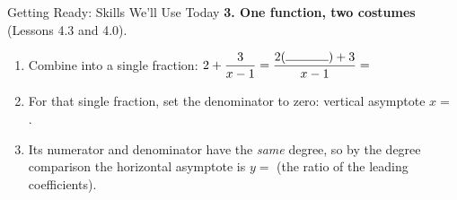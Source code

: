 \documentclass[10pt]{article}
\begin{document}
\begin{notesbox}{Getting Ready: Skills We'll Use Today}
\vspace{4pt}
\textbf{3. One function, two costumes} (Lessons 4.3 and 4.0).
\begin{enumerate}[label=(\alph*), leftmargin=2.1em, itemsep=3pt]
  \item Combine into a single fraction: \; $2+\dfrac{3}{x-1}=\dfrac{2(\rule{1.2cm}{0.4pt})+3}{x-1}
        =$ \blank{2.0cm}
  \item For that single fraction, set the denominator to zero: vertical asymptote
        $x=$ \blank{1.0cm}.
  \item Its numerator and denominator have the \emph{same} degree, so by the degree comparison the
        horizontal asymptote is $y=$ \blank{1.0cm} (the ratio of the leading coefficients).
\end{enumerate}

\end{notesbox}
\end{document}
